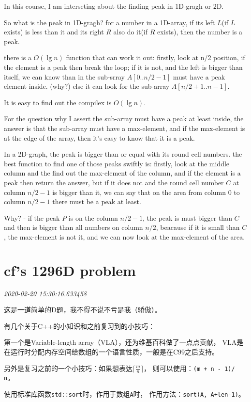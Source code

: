 \documentclass{peterlitsdoc}
\newcommand{\timetx}[1]
    {\par\noindent\emph{\pltgray\small #1}\vspace{2em}}
\newcommand{\vb}{\verb}
\begin{document}
In this course, I am interseting about the finding peak in 1D-gragh or 2D.

So what is the peak in 1D-gragh?
for a number in a 1D-array, if its left $L$(if $L$ exists) is less than it and its
right $R$ also do it(if $R$ exists), then the number is a peak.

there is a $O(\lg n)$ function that can work it out:
firstly, look at n/2 position, if the element is a peak then break the loop;
if it is not, and the left is bigger than itself, we can know than in the
sub-srray $A[0..n/2-1]$ must have a peak element inside. (why?)
else it can look for the sub-array $A[n/2+1..n-1]$.

It is easy to find out the compilex is $O(\lg n)$.

For the question why I assert the sub-array must have a peak at least inside,
the answer is that the sub-array must have a max-element, and if the max-element
is at the edge of the array, then it's easy to know that it is a peak.

In a 2D-graph, the peak is bigger than or equal with its round cell numbers. the
best function to find one of those peaks swiftly is: firstly, look at the middle
column and the find out the max-element of the column, and if the element is a
peak then return the answer, but if it does not and the round cell number $C$ at
column $n/2-1$ is bigger than it, we can say that on the area from column $0$ to
column $n/2-1$ there must be a peak at least.

Why? - if the peak $P$ is on the column $n/2-1$, the peak is must bigger than
$C$ and then is bigger than all numbers on column $n/2$, beacause if it is small
than $C$, the max-element is not it, and we can now look at the max-element of
the area.


\section{cf's 1296D problem}\timetx{2020-02-20 15:30:16.633458}

这是一道简单的D题，我不得不说不亏是我（骄傲）。

有几个关于C++的小知识和之前复习到的小技巧：

第一个是Variable-length array（VLA），还为维基百科做了一点点贡献，
VLA是在运行时分配内存空间给数组的一个语言性质，一般是在C99之后支持。

另外是复习之前的一个小技巧：如果想表达$\lceil\frac{m}{n}\rceil$，
则可以使用：\vb|(m + n - 1)/ n|。

使用标准库函数\vb|std::sort|时，作用于数组\vb|A|时，
作用方法：\vb|sort(A, A+len-1)|。
\end{document}
